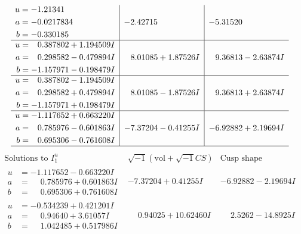 \documentclass[1p]{elsarticle_modified}
\theoremstyle{definition}
\newcommand{\I}{\sqrt{-1}}
\begin{document}
$$\begin{array}{c|c|c}
\begin{aligned}
u &= -1.21341\phantom{ +0.000000I} \\
a &= -0.0217834\phantom{ +0.000000I} \\
b &= -0.330185\phantom{ +0.000000I}\end{aligned}
 & -2.42715\phantom{ +0.000000I} & -5.31520\phantom{ +0.000000I} \\ \hline\begin{aligned}
u &= \phantom{-}0.387802 + 1.194509 I \\
a &= \phantom{-}0.298582 - 0.479894 I \\
b &= -1.157971 - 0.198479 I\end{aligned}
 & \phantom{-}8.01085 + 1.87526 I & \phantom{-}9.36813 - 2.63874 I \\ \hline\begin{aligned}
u &= \phantom{-}0.387802 - 1.194509 I \\
a &= \phantom{-}0.298582 + 0.479894 I \\
b &= -1.157971 + 0.198479 I\end{aligned}
 & \phantom{-}8.01085 - 1.87526 I & \phantom{-}9.36813 + 2.63874 I \\ \hline\begin{aligned}
u &= -1.117652 + 0.663220 I \\
a &= \phantom{-}0.785976 - 0.601863 I \\
b &= \phantom{-}0.695306 - 0.761608 I\end{aligned}
 & -7.37204 - 0.41255 I & -6.92882 + 2.19694 I\\
 \hline 
 \end{array}$$\newpage$$\begin{array}{c|c|c}  
\text{Solutions to }I^u_{1}& \I (\text{vol} + \sqrt{-1}CS) & \text{Cusp shape}\\
 \hline 
\begin{aligned}
u &= -1.117652 - 0.663220 I \\
a &= \phantom{-}0.785976 + 0.601863 I \\
b &= \phantom{-}0.695306 + 0.761608 I\end{aligned}
 & -7.37204 + 0.41255 I & -6.92882 - 2.19694 I \\ \hline\begin{aligned}
u &= -0.534239 + 0.421201 I \\
a &= \phantom{-}0.94640 + 3.61057 I \\
b &= \phantom{-}1.042485 + 0.517986 I\end{aligned}
 & \phantom{-}0.94025 + 10.62460 I & \phantom{-}2.5262 - 14.8925 I \\ \hline\begin{aligned}

\end{aligned}
\end{array}$$
\end{document}
